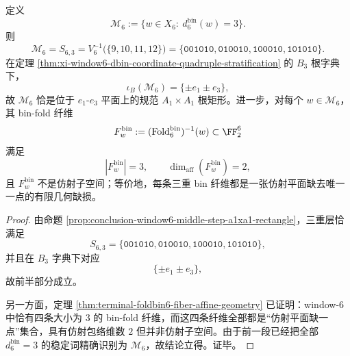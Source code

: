 \begin{theorem}\label{thm:conclusion-window6-middle-bin-root-rectangle-affine-defect}
定义
\[
\mathcal M_6
:=
\{w\in X_6:\ d_6^{\mathrm{bin}}(w)=3\}.
\]
则
\[
\mathcal M_6
=
S_{6,3}
=
V_6^{-1}\!\bigl(\{9,10,11,12\}\bigr)
=
\{\texttt{001010},\texttt{010010},\texttt{100010},\texttt{101010}\}.
\]
在定理 \ref{thm:xi-window6-dbin-coordinate-quadruple-stratification} 的 \(B_3\) 根字典下，
\[
\iota_B(\mathcal M_6)=\{\pm e_1\pm e_3\},
\]
故 \(\mathcal M_6\) 恰是位于 \(e_1\)-\(e_3\) 平面上的规范 \(A_1\times A_1\) 根矩形。进一步，对每个 \(w\in\mathcal M_6\)，其 bin-fold 纤维
\[
F_w^{\mathrm{bin}}
:=
(\mathrm{Fold}^{\mathrm{bin}}_6)^{-1}(w)\subset \FF_2^6
\]
满足
\[
|F_w^{\mathrm{bin}}|=3,
\qquad
\dim_{\mathrm{aff}}(F_w^{\mathrm{bin}})=2,
\]
且 \(F_w^{\mathrm{bin}}\) 不是仿射子空间；等价地，每条三重 bin 纤维都是一张仿射平面缺去唯一一点的有限几何缺损。
\end{theorem}
\begin{proof}
由命题 \ref{prop:conclusion-window6-middle-step-a1xa1-rectangle}，三重层恰满足
\[
S_{6,3}
=
\{\texttt{001010},\texttt{010010},\texttt{100010},\texttt{101010}\},
\]
并且在 \(B_3\) 字典下对应
\[
\{\pm e_1\pm e_3\},
\]
故前半部分成立。

另一方面，定理 \ref{thm:terminal-foldbin6-fiber-affine-geometry} 已证明：window-\(6\) 中恰有四条大小为 \(3\) 的 bin-fold 纤维，而这四条纤维全部都是“仿射平面缺一点”集合，具有仿射包络维数 \(2\) 但并非仿射子空间。由于前一段已经把全部 \(d_6^{\mathrm{bin}}=3\) 的稳定词精确识别为 \(\mathcal M_6\)，故结论立得。证毕。
\end{proof}

